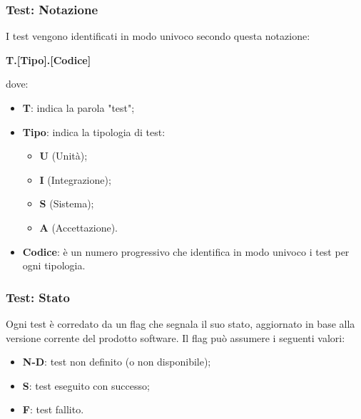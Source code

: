 \subsubsection{Test: Notazione}
\par I test vengono identificati in modo univoco secondo questa notazione: 
\par \quad \textbf{T.[Tipo].[Codice]}
\par dove: 
\begin{itemize}
    \item \textbf{T}: indica la parola "test";
    \item \textbf{Tipo}: indica la tipologia di test: 
        \begin{itemize}
            \item \textbf{U} (Unità); 
            \item \textbf{I} (Integrazione);
            \item \textbf{S} (Sistema);
            \item \textbf{A} (Accettazione).
        \end{itemize}
    \item \textbf{Codice}: è un numero progressivo che identifica in modo univoco i test per ogni tipologia.
\end{itemize}

\subsubsection{Test: Stato}
\par Ogni test è corredato da un flag che segnala il suo stato, aggiornato in base alla versione corrente del prodotto software. Il flag può assumere i seguenti valori:
\begin{itemize}
    \item \textbf{N-D}: test non definito (o non disponibile);
    \item \textbf{S}: test eseguito con successo;
    \item \textbf{F}: test fallito.
\end{itemize}